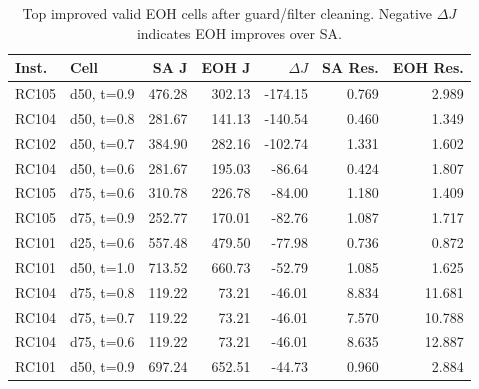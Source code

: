 \begin{table}[t]
\centering
\caption{Top improved valid EOH cells after guard/filter cleaning. Negative \(\Delta J\) indicates EOH improves over SA.}
\label{tab:top-improvements}
\small
\begin{tabular}{llrrrrr}
\toprule
Inst. & Cell & SA J & EOH J & $\Delta J$ & SA Res. & EOH Res. \\
\midrule
RC105 & d50, t=0.9 & 476.28 & 302.13 & -174.15 & 0.769 & 2.989 \\
RC104 & d50, t=0.8 & 281.67 & 141.13 & -140.54 & 0.460 & 1.349 \\
RC102 & d50, t=0.7 & 384.90 & 282.16 & -102.74 & 1.331 & 1.602 \\
RC104 & d50, t=0.6 & 281.67 & 195.03 & -86.64 & 0.424 & 1.807 \\
RC105 & d75, t=0.6 & 310.78 & 226.78 & -84.00 & 1.180 & 1.409 \\
RC105 & d75, t=0.9 & 252.77 & 170.01 & -82.76 & 1.087 & 1.717 \\
RC101 & d25, t=0.6 & 557.48 & 479.50 & -77.98 & 0.736 & 0.872 \\
RC101 & d50, t=1.0 & 713.52 & 660.73 & -52.79 & 1.085 & 1.625 \\
RC104 & d75, t=0.8 & 119.22 & 73.21 & -46.01 & 8.834 & 11.681 \\
RC104 & d75, t=0.7 & 119.22 & 73.21 & -46.01 & 7.570 & 10.788 \\
RC104 & d75, t=0.6 & 119.22 & 73.21 & -46.01 & 8.635 & 12.887 \\
RC101 & d50, t=0.9 & 697.24 & 652.51 & -44.73 & 0.960 & 2.884 \\
\bottomrule
\end{tabular}
\end{table}
